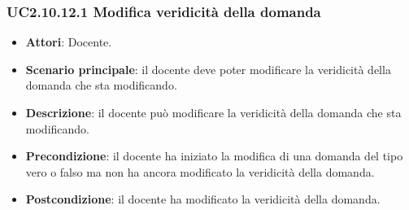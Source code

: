 \subsubsection{UC2.10.12.1 Modifica veridicità della domanda}
\begin{itemize}
\item \textbf{Attori}: Docente.
\item \textbf{Scenario principale}: il docente deve poter modificare la veridicità della domanda che sta modificando.
\item \textbf{Descrizione}: il docente può modificare la veridicità della domanda che sta modificando.
\item \textbf{Precondizione}: il docente ha iniziato la modifica di una domanda del tipo vero o falso ma non ha ancora modificato la veridicità della domanda.
\item \textbf{Postcondizione}: il docente ha modificato la veridicità della domanda.
\end{itemize}
